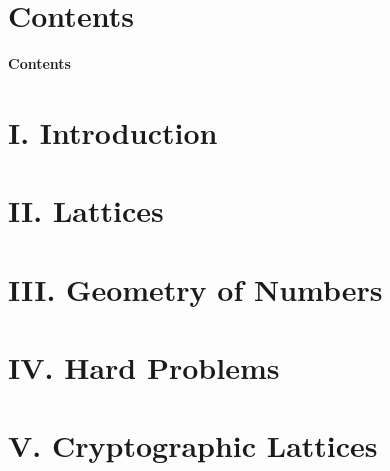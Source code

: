 \documentclass[10pt,aspectratio=1610,compress,dvipsnames]{beamer}
\begin{document}
\begin{frame}
  \titlepage
\end{frame}

\section*{Contents}
\begin{frame}{\textbf{Contents}}
  \tableofcontents
\end{frame}

\section{I. Introduction}


\section{II. Lattices}


\section{III. Geometry of Numbers}


\section{IV. Hard Problems}


\section{V. Cryptographic Lattices}

\end{document}
